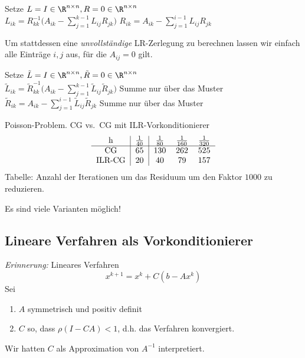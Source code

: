 \begin{algorithm}[H]
 \SetAlgoLined
 Setze $L=I \in \R^{n \times n},R=0 \in \R^{n \times n}$\\
 {
   {
     $\displaystyle L_{ik} = R_{kk}^{-1} \Big( A_{ik} - \sum_{j=1}^{k-1} L_{ij} R_{jk} \Big)$
   }
   {
     $\displaystyle R_{ik} =  A_{ik} - \sum_{j=1}^{i-1} L_{ij} R_{jk}$
   }
 }
\end{algorithm}

Um stattdessen eine \emph{unvollständige} LR-Zerlegung zu berechnen lassen wir einfach alle Einträge $i,j$ aus,
für die $A_{ij}=0$ gilt.

\medskip

\begin{algorithm}[H]
 \SetAlgoLined
 Setze $\tilde{L}=I \in \R^{n \times n},\tilde{R}=0 \in \R^{n \times n}$\\
 {
   {
     $\displaystyle \tilde{L}_{ik} = \tilde{R}_{kk}^{-1} \Big( A_{ik} - \sum_{j=1}^{k-1} \tilde{L}_{ij} \tilde{R}_{jk} \Big)$
     \qquad Summe nur über das Muster
   }
   {
     $\displaystyle \tilde{R}_{ik} =  A_{ik} - \sum_{j=1}^{i-1} \tilde{L}_{ij} \tilde{R}_{jk}$
     \qquad Summe nur über das Muster
   }
 }
\end{algorithm}


\begin{bsp}
Poisson-Problem. CG vs.\ CG mit ILR-Vorkonditionierer
\begin{equation*}
\begin{tabular}{c|c|ccc}
h & $\frac{1}{40}$ & $\frac{1}{80}$ & $\frac{1}{160}$ & $\frac{1}{320}$ \\
\hline
CG & 65 & 130 & 262 & 525 \\
ILR-CG & 20 & 40 & 79 & 157
\end{tabular}
\end{equation*}
Tabelle: Anzahl der Iterationen um das Residuum um den Faktor $1000$ zu reduzieren.
\end{bsp}

Es sind viele Varianten möglich!

\subsection{Lineare Verfahren als Vorkonditionierer}
\emph{Erinnerung:} Lineares Verfahren
\begin{equation*}
 x^{k+1}=x^k+C (b-Ax^k)
\end{equation*}
Sei
\begin{enumerate}
 \item $A$ symmetrisch und positiv definit
 \item $C$ so, dass $\rho (I-CA)<1$, d.h. das Verfahren konvergiert.
\end{enumerate}
Wir hatten $C$ als Approximation von $A^{-1}$ interpretiert.

